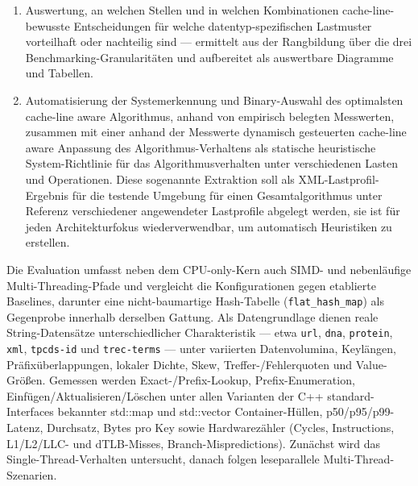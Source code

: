 \begin{enumerate}
  Entwurfsbestandteil wird --- innerhalb der Suchalgorithmus-Hülle wie der
  Algorithmus-Kategorie-Hülle --- in jeder gemeinsamen Interface-Funktion seiner Kategorie isoliert
  gegen Lastprofile gemessen; die Algorithmen der Kategorie werden je Interface-Funktion
  untereinander vergleichend ausgewertet, unter Einhaltung latenzbewusster Best Practices der
  Datenbankforschung), \emph{Makro-Benchmarking} (die einzelnen Interface-Operationen des
  Suchalgorithmus als Ganzes --- z.\,B.\ Einfügen, Punktsuche, Löschen --- werden über die
  Interface-Funktionen der Algorithmus-Kategorie gegen Beispiellasten bzw.\ Test-Teilbereiche der
  Algorithmus-Bestandteile gemessen) und \emph{Gesamt-Benchmarking} (etablierte YCSB-ähnliche
  Lastprofile und vergleichbare Frameworks über jede Rekombination der Entwurfsbestandteile).
  \item Auswertung, an welchen Stellen und in welchen Kombinationen cache-line-bewusste
  Entscheidungen für welche datentyp-spezifischen Lastmuster vorteilhaft oder nachteilig sind ---
  ermittelt aus der Rangbildung über die drei Benchmarking-Granularitäten und aufbereitet als
  auswertbare Diagramme und Tabellen.
  \item Automatisierung der Systemerkennung und Binary-Auswahl des optimalsten cache-line aware
  Algorithmus, anhand von empirisch belegten Messwerten, zusammen mit einer anhand der Messwerte
  dynamisch gesteuerten cache-line aware Anpassung des Algorithmus-Verhaltens als statische
  heuristische System-Richtlinie für das Algorithmusverhalten unter verschiedenen Lasten und
  Operationen. Diese sogenannte Extraktion soll als XML-Lastprofil-Ergebnis für die testende
  Umgebung für einen Gesamtalgorithmus unter Referenz verschiedener angewendeter Lastprofile
  abgelegt werden, sie ist für jeden Architekturfokus wiederverwendbar, um automatisch Heuristiken
  zu erstellen.
\end{enumerate}

Die Evaluation umfasst neben dem CPU-only-Kern auch SIMD- und nebenläufige Multi-Threading-Pfade und
vergleicht die Konfigurationen gegen etablierte Baselines, darunter eine nicht-baumartige
Hash-Tabelle (\texttt{flat\_hash\_map}) als Gegenprobe innerhalb derselben Gattung. Als
Datengrundlage dienen reale String-Datensätze unterschiedlicher Charakteristik --- etwa
\texttt{url}, \texttt{dna}, \texttt{protein}, \texttt{xml}, \texttt{tpcds-id} und
\texttt{trec-terms} --- unter variierten Datenvolumina, Keylängen, Präfixüberlappungen, lokaler
Dichte, Skew, Treffer-/Fehlerquoten und Value-Größen. Gemessen werden Exact-/Prefix-Lookup,
Prefix-Enumeration, Einfügen/Aktualisieren/Löschen unter allen Varianten der C++ standard-Interfaces
bekannter std::map und std::vector Container-Hüllen, p50/p95/p99-Latenz, Durchsatz, Bytes pro Key
sowie Hardwarezähler (Cycles, Instructions, L1/L2/LLC- und dTLB-Misses, Branch-Mispredictions).
Zunächst wird das Single-Thread-Verhalten untersucht, danach folgen leseparallele
Multi-Thread-Szenarien.


